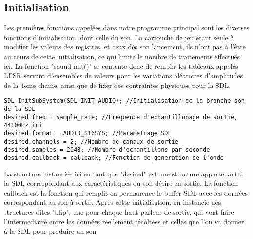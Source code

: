 \documentclass{report}
\begin{document}
\subsection{Initialisation}
Les premières fonctions appelées dans notre programme principal sont les diverses fonctions d'initialisation, dont celle du son.
La cartouche de jeu étant seule à modifier les valeurs des registres, et ceux dès son lancement, ils n'ont pas à l'être au cours de cette initialisation, ce qui limite le nombre de traitements effectués ici.
La fonction "sound init()" se contente donc de remplir les tableaux appelés LFSR servant d'ensembles de valeurs pour les variations aléatoires d'amplitudes de la 4eme chaine, ainsi que de fixer des contraintes physiques pour la SDL.
\begin{lstlisting}
SDL_InitSubSystem(SDL_INIT_AUDIO); //Initialisation de la branche son de la SDL
desired.freq = sample_rate; //Frequence d'echantillonage de sortie, 44100Hz ici
desired.format = AUDIO_S16SYS; //Parametrage SDL
desired.channels = 2; //Nombre de canaux de sortie
desired.samples = 2048; //Nombre d'echantillons par seconde
desired.callback = callback; //Fonction de generation de l'onde
\end{lstlisting}
La structure instanciée ici en tant que "desired" est une structure appartenant à la SDL correspondant aux caractéristiques du son désiré en sortie.
La fonction callback est la fonction qui remplit en permanence le buffer SDL avec les données correspondant au son à sortir.
Après cette initialisation, on instancie des structures dites "blip", une pour chaque haut parleur de sortie, qui vont faire l'intermediaire entre les données réellement récoltées et celles que l'on va donner à la SDL pour produire un son.
\end{document}
